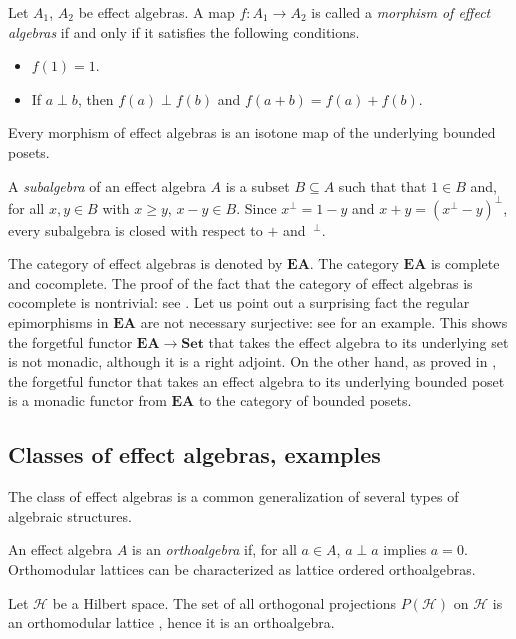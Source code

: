\documentclass[smallextended]{svjour3}
\begin{document}
Let $A_1$, $A_2$ be effect algebras. A map $f:A_1\to A_2$ is called a
{\em morphism of effect algebras} if and only if it satisfies the following conditions.
\begin{itemize}
\item $f(1)=1$.
\item If $a\perp b$, then $f(a)\perp f(b)$ and $f(a+ b)=f(a)+f(b)$.
\end{itemize}
Every morphism of effect algebras is an isotone map of the underlying bounded posets. 

A {\em subalgebra} of an effect algebra $A$ is a subset $B\subseteq A$ such that
that $1\in B$ and, for all $x,y\in B$ with $x\geq y$,
$x-y\in B$. Since $x^\perp=1-y$ and $x+y=(x^\perp-y)^\perp$,
every subalgebra is closed with respect to $+$ and $~^\perp$.

The category of effect algebras is denoted by ${\mathbf{EA}}$. 
The category ${\mathbf{EA}}$ is complete and cocomplete. The proof of the fact that the category of effect algebras
is cocomplete is nontrivial: see \cite{jacobs2012coreflections}. Let us point out a
surprising fact the regular epimorphisms in ${\mathbf{EA}}$ are not necessary surjective:
see \cite[Section 5.2]{jacobs2012coreflections} for an example. This shows 
the forgetful functor ${\mathbf{EA}}\to{\mathbf{Set}}$ that takes the effect algebra to its underlying
set is not monadic, although it is a right adjoint. 
On the other hand, as proved in \cite{jenca2015effect}, the forgetful 
functor that takes an effect algebra to its underlying bounded poset is a 
monadic functor from ${\mathbf{EA}}$ to the category of bounded posets.

\subsection{Classes of effect algebras, examples}

The class of effect algebras is a common generalization of several types
of algebraic structures.

An effect algebra $A$ is an {\em orthoalgebra} \cite{FouGreRut:FaSiO} if, for
all $a\in A$, $a\perp a$ implies $a=0$. Orthomodular lattices \cite{Kal:OL,Ber:OLaAA} can
be characterized as lattice ordered orthoalgebras.

\begin{example}
Let $\mathcal H$ be a Hilbert space.
The set of all orthogonal projections $P(\mathcal H)$ on $\mathcal H$
is an orthomodular lattice \cite{PtaPul:OSaQL}, hence it is an orthoalgebra.
\end{example}
\end{document}
